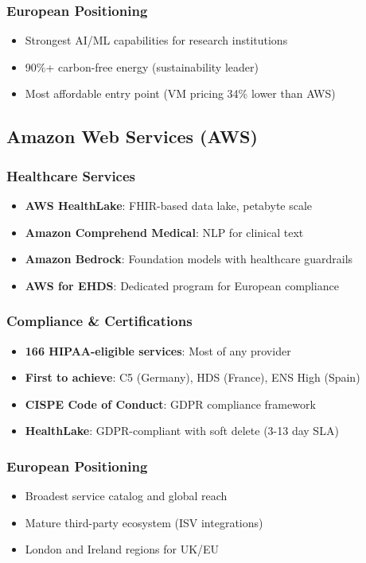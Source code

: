 \documentclass[11pt,a4paper]{article}
\begin{document}
\subsubsection{European Positioning}
\begin{itemize}
    \item Strongest AI/ML capabilities for research institutions
    \item 90\%+ carbon-free energy (sustainability leader)
    \item Most affordable entry point (VM pricing 34\% lower than AWS)
\end{itemize}

\subsection{Amazon Web Services (AWS)}

\subsubsection{Healthcare Services}
\begin{itemize}
    \item \textbf{AWS HealthLake}: FHIR-based data lake, petabyte scale
    \item \textbf{Amazon Comprehend Medical}: NLP for clinical text
    \item \textbf{Amazon Bedrock}: Foundation models with healthcare guardrails
    \item \textbf{AWS for EHDS}: Dedicated program for European compliance
\end{itemize}

\subsubsection{Compliance \& Certifications}
\begin{itemize}
    \item \textbf{166 HIPAA-eligible services}: Most of any provider
    \item \textbf{First to achieve}: C5 (Germany), HDS (France), ENS High (Spain)
    \item \textbf{CISPE Code of Conduct}: GDPR compliance framework
    \item \textbf{HealthLake}: GDPR-compliant with soft delete (3-13 day SLA)
\end{itemize}

\subsubsection{European Positioning}
\begin{itemize}
    \item Broadest service catalog and global reach
    \item Mature third-party ecosystem (ISV integrations)
    \item London and Ireland regions for UK/EU
\end{itemize}
\end{document}
